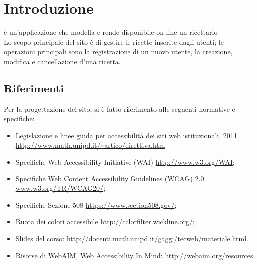 \section{Introduzione}{
	\textbf{\ggt} è un'applicazione che modella e rende disponibile on-line un ricettario\\
	Lo scopo principale del sito è di gestire le ricette inserite dagli utenti; le operazioni principali sono la registrazione di un nuovo utente, la creazione, modifica e cancellazione d'una ricetta.
	
    \subsection{Riferimenti}{
		Per la progettazione del sito, si è fatto riferimento alle seguenti normative e specifiche:
		\begin{itemize}\itemsep0.5pt
			\item Legislazione e linee guida per accessibilità dei siti web istituzionali, 2011 \url{http://www.math.unipd.it/~artico/direttiva.htm}
			\item Specifiche Web Accessibility Initiative (WAI)  \url{http://www.w3.org/WAI};
			\item Specifiche Web Content Accessibility Guidelines (WCAG) 2.0 \url{www.w3.org/TR/WCAG20/};
			\item Specifiche Sezione 508 \url{https://www.section508.gov/};
			\item Ruota dei colori accessibile \url{http://colorfilter.wickline.org/};
			\item Slides del corso: \url{http://docenti.math.unipd.it/gaggi/tecweb/materiale.html}.
			\item Risorse di WebAIM, Web Accessibility In Mind: \url{http://webaim.org/resources}
		\end{itemize}
    }
}

